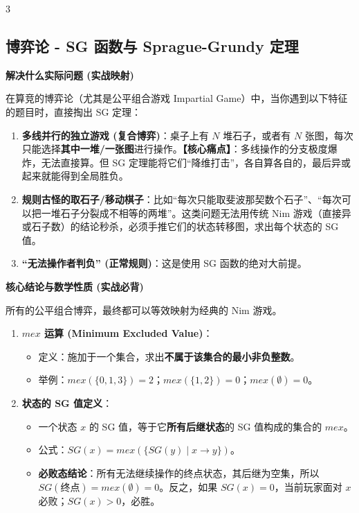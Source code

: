 \documentclass[10pt,landscape,a4paper]{article}
\begin{document}
\begin{multicols*}{3}
\subsection*{博弈论 - SG 函数与 Sprague-Grundy 定理}
\par\addvspace{0.7ex}\noindent\textbf{解决什么实际问题 (实战映射)}\par\nobreak
在算竞的博弈论（尤其是公平组合游戏 Impartial Game）中，当你遇到以下特征的题目时，直接掏出 SG 定理：\par
\begin{enumerate}[start=1]
\item \textbf{多线并行的独立游戏 (复合博弈)}：桌子上有 $N$ 堆石子，或者有 $N$ 张图，每次只能选择\textbf{其中一堆/一张图}进行操作。\textbf{【核心痛点】}：多线操作的分支极度爆炸，无法直接算。但 SG 定理能将它们“降维打击”，各自算各自的，最后异或起来就能得到全局胜负。
\item \textbf{规则古怪的取石子/移动棋子}：比如“每次只能取斐波那契数个石子”、“每次可以把一堆石子分裂成不相等的两堆”。这类问题无法用传统 Nim 游戏（直接异或石子数）的结论秒杀，必须手推它们的状态转移图，求出每个状态的 SG 值。
\item \textbf{“无法操作者判负” (正常规则)}：这是使用 SG 函数的绝对大前提。
\end{enumerate}
\par\addvspace{0.7ex}\noindent\textbf{核心结论与数学性质 (实战必背)}\par\nobreak
所有的公平组合博弈，最终都可以等效映射为经典的 Nim 游戏。\par
\begin{enumerate}[start=1]
\item \textbf{$mex$ 运算 (Minimum Excluded Value)}：
\begin{itemize}
\item 定义：施加于一个集合，求出\textbf{不属于该集合的最小非负整数}。
\item 举例：$mex(\{0, 1, 3\}) = 2$；$mex(\{1, 2\}) = 0$；$mex(\emptyset) = 0$。
\end{itemize}
\item \textbf{状态的 SG 值定义}：
\begin{itemize}
\item 一个状态 $x$ 的 SG 值，等于它\textbf{所有后继状态}的 SG 值构成的集合的 $mex$。
\item 公式：$SG(x) = mex(\{SG(y) \mid x \to y\})$。
\item \textbf{必败态结论}：所有无法继续操作的终点状态，其后继为空集，所以 $SG(\text{终点}) = mex(\emptyset) = 0$。反之，如果 $SG(x) = 0$，当前玩家面对 $x$ 必败；$SG(x) > 0$，必胜。

\end{itemize}
\end{enumerate}
\end{multicols*}
\end{document}
